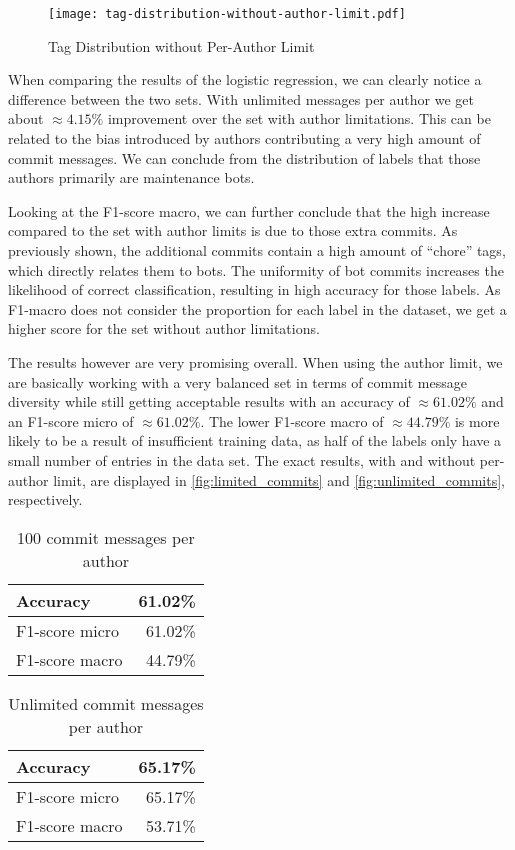 \begin{figure}[H]
  \centering
  \texttt{[image: tag-distribution-without-author-limit.pdf]}
  \caption{Tag Distribution without Per-Author Limit}
  \label{fig:tag_dist_without_limit}
\end{figure}

When comparing the results of the logistic regression, we can clearly notice a difference between the two sets.
With unlimited messages per author we get about $\approx4.15\%$ improvement over the set with author limitations. This
can be related to the bias introduced by authors contributing a very high amount of commit messages. We can
conclude from the distribution of labels that those authors primarily are maintenance bots.

Looking at the F1-score macro, we can further conclude that the high increase compared to the set with author
limits is due to those extra commits. As previously shown, the additional commits contain a high amount of
“chore” tags, which directly relates them to bots. The uniformity of bot commits increases the likelihood
of correct classification, resulting in high accuracy for those labels. As F1-macro does not consider the
proportion for each label in the dataset, we get a higher score for the set without author limitations.

The results however are very promising overall. When using the author limit, we are basically working with a
very balanced set in terms of commit message diversity while still getting acceptable results with an accuracy
of $\approx61.02\%$ and an F1-score micro of $\approx61.02\%$. The lower F1-score macro of $\approx44.79\%$ is more likely to be a
result of insufficient training data, as half of the labels only have a small number of entries in the data set.
The exact results, with and without per-author limit, are displayed in \autoref{fig:limited_commits}
and \autoref{fig:unlimited_commits}, respectively.

\begin{table}[H]
  \def\arraystretch{1.15}%
  \centering
  \begin{tabular}{|l|r|}
    \hline
    Accuracy       & 61.02\% \\
    \hline
    F1-score micro & 61.02\% \\
    \hline
    F1-score macro & 44.79\% \\
    \hline
  \end{tabular}
  \caption{100 commit messages per author}
  \label{fig:limited_commits}
\end{table}

\begin{table}[H]
  \def\arraystretch{1.15}%
  \centering
  \begin{tabular}{|l|r|}
    \hline
    Accuracy       & 65.17\% \\
    \hline
    F1-score micro & 65.17\% \\
    \hline
    F1-score macro & 53.71\% \\
    \hline
  \end{tabular}
  \caption{Unlimited commit messages per author}
  \label{fig:unlimited_commits}
\end{table}
